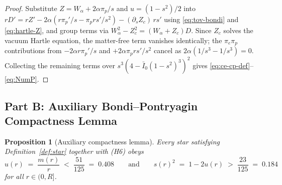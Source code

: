 \documentclass[11pt]{article}
\theoremstyle{plain}
\newtheorem{proposition}[theorem]{Proposition}
\theoremstyle{definition}
\newcommand{\Ibar}{\bar{I}}
\begin{document}
\begin{proof}
Substitute $Z = W_\alpha + 2\alpha \pi_p/s$ and $u = (1 - s^2)/2$ into $r D' = r Z' - 2\alpha(r \pi_p'/s - \pi_p r s'/s^2) - (\partial_s Z_c)\,r s'$ using \eqref{eq:tov-bondi} and \eqref{eq:hartle-Z}, and group terms via $W_\alpha^2 - Z_c^2 = (W_\alpha + Z_c) D$. Since $Z_c$ solves the vacuum Hartle equation, the matter-free term vanishes identically; the $\pi_e \pi_p$ contributions from $-2\alpha r \pi_p'/s$ and $+2\alpha \pi_p r s'/s^2$ cancel as $2\alpha(1/s^3 - 1/s^3) = 0$. Collecting the remaining terms over $s^3(4 - \Ibar_0(1-s^2)^3)^2$ gives \eqref{eq:ce-cp-def}--\eqref{eq:NumP}.
\end{proof}

\subsection{Part B: Auxiliary Bondi--Pontryagin Compactness Lemma}

\begin{proposition}[Auxiliary compactness lemma]
\label{prop:partB}
Every star satisfying Definition~\ref{def:star} together with (H6) obeys
\begin{equation}
  u(r) \;=\; \frac{m(r)}{r} \;<\; \frac{51}{125} \;=\; 0.408 \qquad \text{and} \qquad
  s(r)^2 \;=\; 1 - 2 u(r) \;>\; \frac{23}{125} \;=\; 0.184
  \label{eq:compactness-wall}
\end{equation}
for all $r \in (0, R]$.
\end{proposition}
\end{document}
